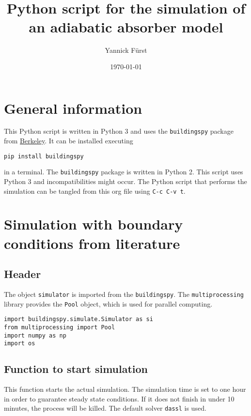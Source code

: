 \documentclass[article,a4paper,oneside,11pt,font=lmodern,language=english,titlepage=default,chapterstyle=article,pagestyle=default,bibliography=authoryear,theorem=colorbox,minted=true]{hri}
\author{Yannick Fürst}
\date{\today}
\title{Python script for the simulation of an adiabatic absorber model}
\begin{document}
\maketitle

\chapter{General information}
\label{sec:org9d0b8eb}

This Python script is written in Python 3 and uses the \texttt{buildingspy} package
from \href{http://simulationresearch.lbl.gov/modelica/buildingspy/}{Berkeley}. It can be installed executing

\begin{verbatim}
pip install buildingspy
\end{verbatim}
in a terminal. The \texttt{buildingspy} package is written in Python 2. This
script uses Python 3 and incompatibilities might occur. The Python script that
performs the simulation can be tangled from this org file using \texttt{C-c C-v t}.

\chapter{Simulation with boundary conditions from literature}
\label{sec:org1e0ab39}
\section{Header}
\label{sec:orgf72f8de}

The object \texttt{simulator} is imported from the \texttt{buildingspy}. The
\texttt{multiprocessing} library provides the \texttt{Pool} object, which is used for
parallel computing.

\begin{verbatim}
import buildingspy.simulate.Simulator as si
from multiprocessing import Pool
import numpy as np
import os
\end{verbatim}

\section{Function to start simulation}
\label{sec:orgad6fbca}

This function starts the actual simulation. The simulation time is set
to one hour in order to guarantee steady state conditions. If it does not
finish in under 10 minutes, the process will be killed. The default solver
\texttt{dassl} is used.
\end{document}
